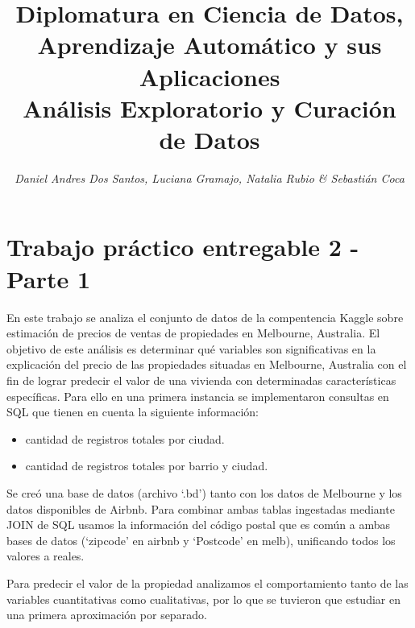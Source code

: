 
\usepackage{rotating}
\usepackage{hyperref}



\title{Diplomatura en Ciencia de Datos, Aprendizaje Automático y sus Aplicaciones \\[5mm]
\Large{Análisis Exploratorio y Curación de Datos}
}
\author{\emph{Daniel Andres Dos Santos, Luciana Gramajo, Natalia Rubio \& Sebastián Coca
}}
\date{\small \myToday}



\maketitle

\section*{Trabajo práctico entregable 2 - Parte 1}

En este trabajo se analiza el conjunto de datos de la compentencia Kaggle sobre estimación de precios de ventas de propiedades en Melbourne, Australia. 
El objetivo de este análisis es determinar qué variables son significativas en la explicación del precio de las propiedades situadas en Melbourne, Australia con el fin de lograr predecir el valor de una vivienda con determinadas características específicas.
Para ello en una primera instancia se implementaron consultas en SQL que tienen en cuenta la siguiente información:

\begin{itemize}
\item cantidad de registros totales por ciudad.
\item cantidad de registros totales por barrio y ciudad.
\end{itemize}

Se creó una base de datos (archivo `.bd') tanto con los datos de Melbourne y los datos disponibles de Airbnb. Para combinar ambas tablas ingestadas mediante JOIN de SQL usamos la información del código postal que es común a ambas bases de datos (`zipcode' en airbnb y `Postcode' en melb), unificando todos los valores a reales.

Para predecir el valor de la propiedad analizamos el comportamiento tanto de las variables cuantitativas como cualitativas, por lo que se tuvieron que estudiar en una primera aproximación por separado.


